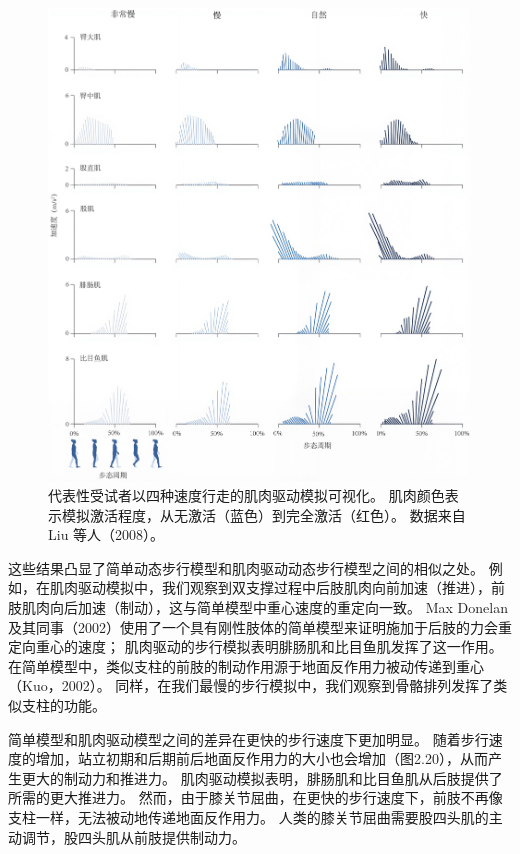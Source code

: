 \begin{figure}[!htb]
	\centering
	\includegraphics[width=1.0\linewidth]{chap11/11_11}
	\caption{代表性受试者以四种速度行走的肌肉驱动模拟可视化。
		肌肉颜色表示模拟激活程度，从无激活（蓝色）到完全激活（红色）。
		数据来自 Liu 等人（2008）。 \label{fig:11_11}}
\end{figure}

这些结果凸显了简单动态步行模型和肌肉驱动动态步行模型之间的相似之处。
例如，在肌肉驱动模拟中，我们观察到双支撑过程中后肢肌肉向前加速（推进），前肢肌肉向后加速（制动），这与简单模型中重心速度的重定向一致。
Max Donelan 及其同事（2002）使用了一个具有刚性肢体的简单模型来证明施加于后肢的力会重定向重心的速度；
肌肉驱动的步行模拟表明腓肠肌和比目鱼肌发挥了这一作用。
在简单模型中，类似支柱的前肢的制动作用源于地面反作用力被动传递到重心（Kuo，2002）。
同样，在我们最慢的步行模拟中，我们观察到骨骼排列发挥了类似支柱的功能。


简单模型和肌肉驱动模型之间的差异在更快的步行速度下更加明显。
随着步行速度的增加，站立初期和后期前后地面反作用力的大小也会增加（图2.20），从而产生更大的制动力和推进力。
肌肉驱动模拟表明，腓肠肌和比目鱼肌从后肢提供了所需的更大推进力。
然而，由于膝关节屈曲，在更快的步行速度下，前肢不再像支柱一样，无法被动地传递地面反作用力。
人类的膝关节屈曲需要股四头肌的主动调节，股四头肌从前肢提供制动力。


